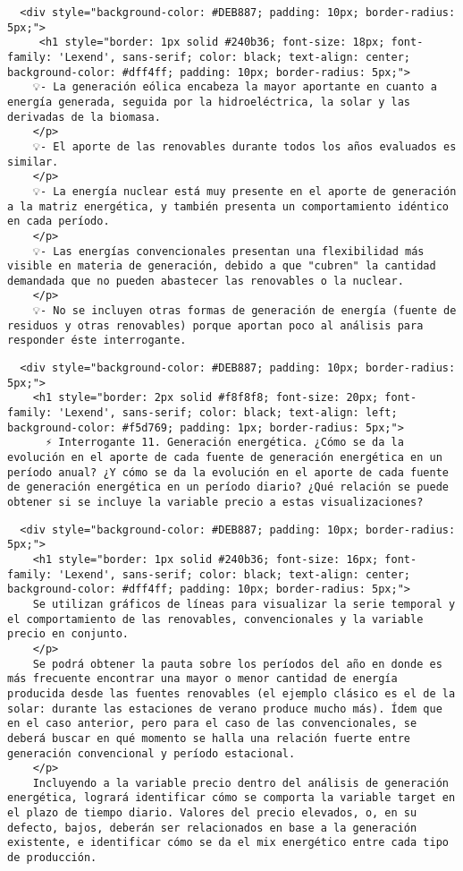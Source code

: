 \documentclass[11pt]{article}
\begin{document}
    \begin{verbatim}
  <div style="background-color: #DEB887; padding: 10px; border-radius: 5px;">
     <h1 style="border: 1px solid #240b36; font-size: 18px; font-family: 'Lexend', sans-serif; color: black; text-align: center; background-color: #dff4ff; padding: 10px; border-radius: 5px;">
    💡- La generación eólica encabeza la mayor aportante en cuanto a energía generada, seguida por la hidroeléctrica, la solar y las derivadas de la biomasa.
    </p>
    💡- El aporte de las renovables durante todos los años evaluados es similar.
    </p>
    💡- La energía nuclear está muy presente en el aporte de generación a la matriz energética, y también presenta un comportamiento idéntico en cada período.
    </p>
    💡- Las energías convencionales presentan una flexibilidad más visible en materia de generación, debido a que "cubren" la cantidad demandada que no pueden abastecer las renovables o la nuclear.
    </p>
    💡- No se incluyen otras formas de generación de energía (fuente de residuos y otras renovables) porque aportan poco al análisis para responder éste interrogante.
\end{verbatim}

    \begin{verbatim}
  <div style="background-color: #DEB887; padding: 10px; border-radius: 5px;">
    <h1 style="border: 2px solid #f8f8f8; font-size: 20px; font-family: 'Lexend', sans-serif; color: black; text-align: left; background-color: #f5d769; padding: 1px; border-radius: 5px;">
      ⚡ Interrogante 11. Generación energética. ¿Cómo se da la evolución en el aporte de cada fuente de generación energética en un período anual? ¿Y cómo se da la evolución en el aporte de cada fuente de generación energética en un período diario? ¿Qué relación se puede obtener si se incluye la variable precio a estas visualizaciones?
\end{verbatim}

    \begin{verbatim}
  <div style="background-color: #DEB887; padding: 10px; border-radius: 5px;">
    <h1 style="border: 1px solid #240b36; font-size: 16px; font-family: 'Lexend', sans-serif; color: black; text-align: center; background-color: #dff4ff; padding: 10px; border-radius: 5px;">
    Se utilizan gráficos de líneas para visualizar la serie temporal y el comportamiento de las renovables, convencionales y la variable precio en conjunto.
    </p>
    Se podrá obtener la pauta sobre los períodos del año en donde es más frecuente encontrar una mayor o menor cantidad de energía producida desde las fuentes renovables (el ejemplo clásico es el de la solar: durante las estaciones de verano produce mucho más). Ídem que en el caso anterior, pero para el caso de las convencionales, se deberá buscar en qué momento se halla una relación fuerte entre generación convencional y período estacional.
    </p>
    Incluyendo a la variable precio dentro del análisis de generación energética, logrará identificar cómo se comporta la variable target en el plazo de tiempo diario. Valores del precio elevados, o, en su defecto, bajos, deberán ser relacionados en base a la generación existente, e identificar cómo se da el mix energético entre cada tipo de producción.
\end{verbatim}
\end{document}
